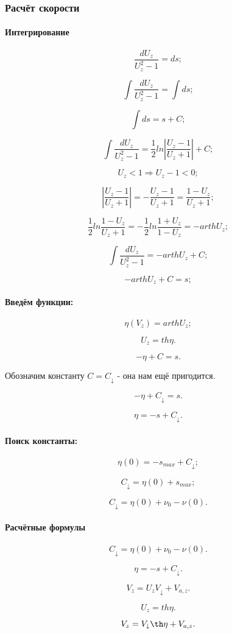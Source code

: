\subsubsection{Расчёт скорости}

\paragraph{Интегрирование}

$$\frac{dU_z}{U_z^2-1} = ds;$$

$$\int \frac{dU_z}{U_z^2-1} = \int ds;$$

$$\int ds = s + C;$$

$$\int \frac{dU_z}{U_z^2-1} = \frac{1}{2}ln \left | \frac{U_z -1}{U_z + 1} \right | + C;$$

$$U_z<1 \Rightarrow U_z-1<0;$$

$$\left | \frac{U_z -1}{U_z + 1} \right | = -\frac{U_z -1}{U_z + 1} = \frac{1 - U_z}{U_z + 1};$$

$$\frac{1}{2}ln \frac{1 - U_z}{U_z + 1} = - \frac{1}{2}ln \frac{1+U_z}{1 - U_z} = -arth U_z;$$

$$\int \frac{dU_z}{U_z^2-1} =  -arth U_z + C;$$

$$-arth U_z + C = s;$$

\paragraph{Введём функции:}

$$\eta(V_z) = arth U_z;$$

$$U_z = th \eta. $$

$$-\eta + C = s.$$

Обозначим константу $C=C_\downarrow$ - она нам ещё пригодится.

$$-\eta + C_\downarrow = s.$$

$$\eta = -s + C_\downarrow.$$

\paragraph{Поиск константы:}

$$\eta(0) = - s_{max} + C_\downarrow;$$

$$C_\downarrow = \eta(0) + s_{max};$$

$$C_\downarrow = \eta(0) + \nu_{0} - \nu(0).$$

\paragraph{Расчётные формулы}

$$C_\downarrow = \eta(0) + \nu_{0} - \nu(0).$$

$$\eta = -s + C_\downarrow.$$

$$V_z = U_z V_\downarrow + V_{a,z}.$$

$$U_z = th \eta. $$

$$V_z =  V_\downarrow \th \eta  + V_{a,z}.$$